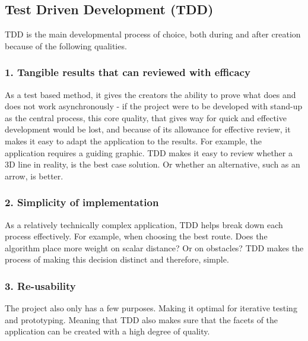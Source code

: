 
\subsection*{Test Driven Development (TDD)}

TDD is the main developmental process of choice, both during and after creation because of the following qualities. 
\subsubsection{1. Tangible results that can reviewed with efficacy}
As a test based method, it gives the creators the ability to prove what does and does not work asynchronously - if the project were to be developed with stand-up as the central process, this core quality, that gives way for quick and effective development would be lost, and because of its allowance for effective review, it makes it easy to adapt the application to the results. For example, the application requires a guiding graphic. TDD makes it easy to review whether a 3D line in reality, is the best case solution. Or whether an alternative, such as an arrow, is better.
\subsubsection{2. Simplicity of implementation}
As a relatively technically complex application, TDD helps break down each process effectively. For example, when choosing the best route. Does the algorithm place more weight on scalar distance? Or on obstacles? TDD makes the process of making this decision distinct and therefore, simple.
\subsubsection{3. Re-usability}
The project also only has a few purposes. Making it optimal for iterative testing and prototyping. Meaning that TDD also makes sure that the facets of the application can be created with a high degree of quality.